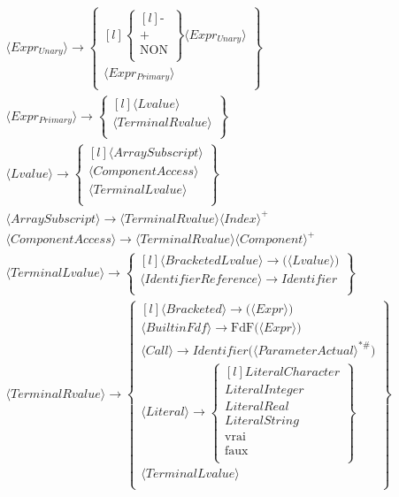 \begin{align*}
\\
&⟨Expr_{Unary}⟩ \to \begin{Bmatrix*}[l]
    \begin{Bmatrix*}[l]
        \text{-} \\
        \text{+} \\
        \text{NON} \\
    \end{Bmatrix*} ⟨Expr_{Unary}⟩ \\
    ⟨Expr_{Primary}⟩ \\
\end{Bmatrix*}
\\
&⟨Expr_{Primary}⟩ \to \begin{Bmatrix*}[l]
    ⟨Lvalue⟩ \\
    ⟨TerminalRvalue⟩ \\
\end{Bmatrix*}
\\
&⟨Lvalue⟩ \to \begin{Bmatrix*}[l]
    ⟨ArraySubscript⟩ \\
    ⟨ComponentAccess⟩ \\
    ⟨TerminalLvalue⟩ \\
\end{Bmatrix*}
\\
&⟨ArraySubscript⟩ \to ⟨TerminalRvalue⟩⟨Index⟩^+
\\
&⟨ComponentAccess⟩ \to ⟨TerminalRvalue⟩⟨Component⟩^+
\\
&⟨TerminalLvalue⟩ \to \begin{Bmatrix*}[l]
    ⟨BracketedLvalue⟩ \to \text{(}⟨Lvalue⟩\text{)} \\
    ⟨IdentifierReference⟩ \to Identifier \\
\end{Bmatrix*}
\\
&⟨TerminalRvalue⟩ \to \begin{Bmatrix*}[l]
    ⟨Bracketed⟩ \to \text{(}⟨Expr⟩\text{)} \\
    ⟨BuiltinFdf⟩ \to \text{FdF}\text{(}⟨Expr⟩\text{)} \\
    ⟨Call⟩ \to Identifier\text{(}⟨ParameterActual⟩^{*\#}\text{)} \\
    ⟨Literal⟩ \to \begin{Bmatrix*}[l]
        LiteralCharacter \\
        LiteralInteger \\
        LiteralReal \\
        LiteralString \\
        \text{vrai} \\
        \text{faux} \\
    \end{Bmatrix*} \\
    ⟨TerminalLvalue⟩ \\
\end{Bmatrix*}


\end{align*}
